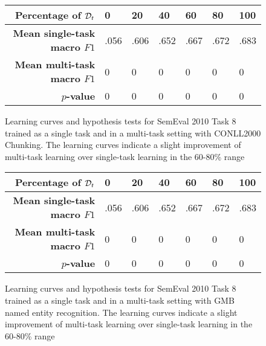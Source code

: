 \begin{figure}
	\centering
	
	\vspace*{1cm}
	
	\begin{tabular}{r | l | l | l | l | l | l}
		\textbf{Percentage of $\mathcal{D}_t$} & 0 & 20 & 40 & 60 & 80 & 100 \\  \hline
		\textbf{Mean single-task macro $F1$} & .056 & .606 & .652 & .667 & .672 & .683\\
		\textbf{Mean multi-task macro $F1$} & 0 & 0 & 0 & 0 & 0 & 0\\
		$p$\textbf{-value} & 0 & 0 & 0 & 0 & 0 & 0
	\end{tabular}
	\caption{Learning curves and hypothesis tests for SemEval 2010 Task 8 trained as a single task and in a multi-task setting with CONLL2000 Chunking. The learning curves indicate a slight improvement of multi-task learning over single-task learning in the 60-80\% range}
\end{figure}
\begin{figure}
	\centering
	
	\vspace*{1cm}
	
	\begin{tabular}{r | l | l | l | l | l | l}
		\textbf{Percentage of $\mathcal{D}_t$} & 0 & 20 & 40 & 60 & 80 & 100 \\  \hline
		\textbf{Mean single-task macro $F1$} & .056 & .606 & .652 & .667 & .672 & .683\\
		\textbf{Mean multi-task macro $F1$} & 0 & 0 & 0 & 0 & 0 & 0\\
		$p$\textbf{-value} & 0 & 0 & 0 & 0 & 0 & 0
	\end{tabular}
	\caption{Learning curves and hypothesis tests for SemEval 2010 Task 8 trained as a single task and in a multi-task setting with GMB named entity recognition. The learning curves indicate a slight improvement of multi-task learning over single-task learning in the 60-80\% range}
\end{figure}
\newpage
